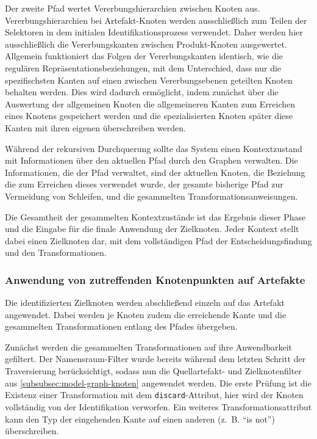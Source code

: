 Der zweite Pfad wertet Vererbungshierarchien zwischen Knoten aus.
Vererbungshierarchien bei Artefakt-Knoten werden ausschließlich zum Teilen der Selektoren in dem initialen Identifikationsprozess verwendet.
Daher werden hier ausschließlich die Vererbungskanten zwischen Produkt-Knoten ausgewertet.
Allgemein funktioniert das Folgen der Vererbungskanten identisch, wie die regulären Repräsentationsbeziehungen, mit dem Unterschied, dass nur die spezifischsten Kanten auf einen zwischen Vererbungsebenen geteilten Knoten behalten werden.
Dies wird dadurch ermöglicht, indem zunächst über die Auswertung der allgemeinen Knoten die allgemeineren Kanten zum Erreichen eines Knotens gespeichert werden und die spezialisierten Knoten später diese Kanten mit ihren eigenen überschreiben werden.

Während der rekursiven Durchquerung sollte das System einen Kontextzustand mit Informationen über den aktuellen Pfad durch den Graphen verwalten.
Die Informationen, die der Pfad verwaltet, sind der aktuellen Knoten, die Beziehung die zum Erreichen dieses verwendet wurde, der gesamte bisherige Pfad zur Vermeidung von Schleifen, und die gesammelten Transformationsanweisungen.

Die Gesamtheit der gesammelten Kontextzustände ist das Ergebnis dieser Phase und die Eingabe für die finale Anwendung der Zielknoten.
Jeder Kontext stellt dabei einen Zielknoten dar, mit dem vollständigen Pfad der Entscheidungsfindung und den Transformationen.

\subsubsection{Anwendung von zutreffenden Knotenpunkten auf Artefakte}\label{subsubsec:model-result-processing-apply-nodes-to-artifact}

Die identifizierten Zielknoten werden abschließend einzeln auf das Artefakt angewendet.
Dabei werden je Knoten zudem die erreichende Kante und die gesammelten Transformationen entlang des Pfades übergeben.

Zunächst werden die gesammelten Transformationen auf ihre Anwendbarkeit gefiltert.
Der Namensraum-Filter wurde bereits während dem letzten Schritt der Traversierung berücksichtigt, sodass nun die Quellartefakt- und Zielknotenfilter aus \autoref{subsubsec:model-graph-knoten} angewendet werden.
Die erste Prüfung ist die Existenz einer Transformation mit dem \texttt{discard}-Attribut, hier wird der Knoten vollständig von der Identifikation verworfen.
Ein weiteres Transformationsattribut kann den Typ der eingehenden Kante auf einen anderen (z.\ B. \enquote{is not}) überschreiben.

